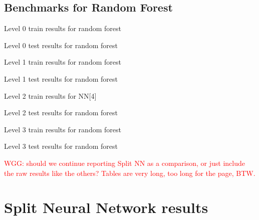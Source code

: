 \documentclass[journal abbreviation, manuscript]{copernicus}
\newcommand\todo[1]{\textcolor{red}{#1}}
\begin{document}
\subsection{Benchmarks for Random Forest}
\label{sec:results-nn4}

\begin{table}[H]
\centering
\scriptsize

\caption{Level 0 train results for random forest}
\end{table}
\begin{table}[H]
\centering
\scriptsize

\caption{Level 0 test results for random forest}
\end{table}

\begin{table}[H]
\centering
\scriptsize

\caption{Level 1 train results for random forest}
\end{table}
\begin{table}[H]
\centering
\scriptsize

\caption{Level 1 test results for random forest}
\end{table}

\begin{table}[H]
\centering
\scriptsize

\caption{Level 2 train results for NN[4]}
\end{table}
\begin{table}[H]
\centering
\scriptsize

\caption{Level 2 test results for random forest}
\end{table}

\begin{table}[H]
\centering
\scriptsize

\caption{Level 3 train results for random forest}
\end{table}
\begin{table}[H]
\centering
\scriptsize

\caption{Level 3 test results for random forest}
\end{table}


\todo{WGG: should we continue reporting Split NN as a comparison, or just include the raw results like the others?  Tables are very long, too long for the page, BTW.}
\section{Split Neural Network results}


\end{document}
